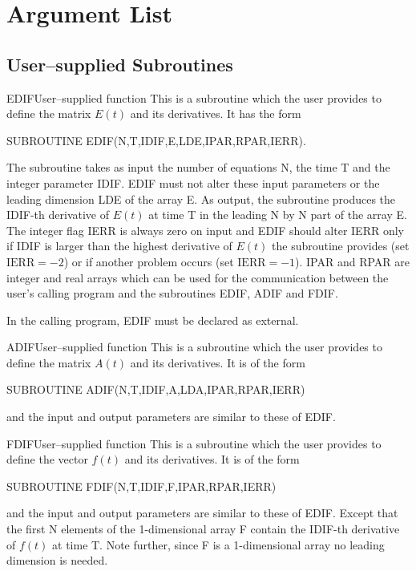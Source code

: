 \section{Argument List}

\subsection{User--supplied Subroutines}

\begin{entry}{EDIF}{User--supplied function}
  This is a subroutine which the user provides to define the matrix $E(t)$
  and its derivatives. It has the form
  \begin{center}
    SUBROUTINE EDIF(N,T,IDIF,E,LDE,IPAR,RPAR,IERR).
  \end{center}
  The subroutine takes as input the number of equations N, the time T
  and the integer parameter IDIF. EDIF must not alter these input
  parameters or the leading dimension LDE of the array E. As output,
  the subroutine produces the IDIF-th derivative of $E(t)$ at time T
  in the leading N by N part of the array E. The integer flag IERR is
  always zero on input and EDIF should alter IERR only if IDIF is
  larger than the highest derivative of $E(t)$ the subroutine provides
  (set $\mbox{IERR}=-2$) or if another problem occurs (set
  $\mbox{IERR}=-1$). IPAR and RPAR are integer and real arrays which
  can be used for the communication between the user's calling program
  and the subroutines EDIF, ADIF and FDIF.

  In the calling program, EDIF must be declared as external.
\end{entry}
\begin{entry}{ADIF}{User--supplied function}
  This is a subroutine which the user provides to define the matrix $A(t)$
  and its derivatives. It is of the form
  \begin{center}
    SUBROUTINE ADIF(N,T,IDIF,A,LDA,IPAR,RPAR,IERR)
  \end{center}
  and the input and output parameters are similar to these of EDIF.
\end{entry}

\begin{entry}{FDIF}{User--supplied function}
  This is a subroutine which the user provides to define the vector $f(t)$
  and its derivatives. It is of the form
  \begin{center}
    SUBROUTINE FDIF(N,T,IDIF,F,IPAR,RPAR,IERR)
  \end{center}
  and the input and output parameters are similar to these of
  EDIF. Except that the first N elements of the 1-dimensional array F
  contain the IDIF-th derivative of $f(t)$ at time T. Note further,
  since F is a 1-dimensional array no leading dimension is needed.
\end{entry}


